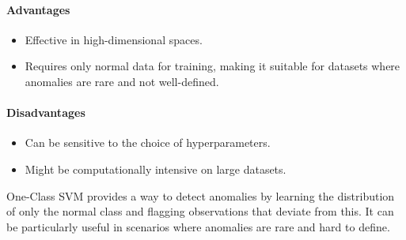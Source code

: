 \paragraph{Advantages}

\begin{itemize}
    \item Effective in high-dimensional spaces.
    \item Requires only normal data for training, making it suitable for datasets where anomalies are rare and not well-defined.
\end{itemize}

\paragraph{Disadvantages}

\begin{itemize}
    \item Can be sensitive to the choice of hyperparameters.
    \item Might be computationally intensive on large datasets.
\end{itemize}


One-Class SVM provides a way to detect anomalies by learning the distribution of only the normal class and flagging observations that deviate from this. It can be particularly useful in scenarios where anomalies are rare and hard to define.
